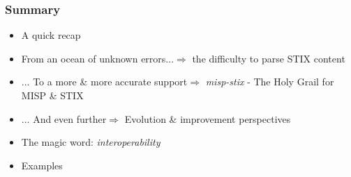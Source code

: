 \begin{frame}
    \frametitle{Summary}
    \begin{itemize}
        \item A quick recap
        \item From an ocean of unknown errors...\linebreak $\Rightarrow$ the difficulty to parse STIX content
        \item ... To a more \& more accurate support\linebreak $\Rightarrow$ \emph{misp-stix} - The Holy Grail for MISP \& STIX
        \item ... And even further\linebreak $\Rightarrow$ Evolution \& improvement perspectives
        \item The magic word: \emph{interoperability}
        \item Examples
    \end{itemize}
\end{frame}

